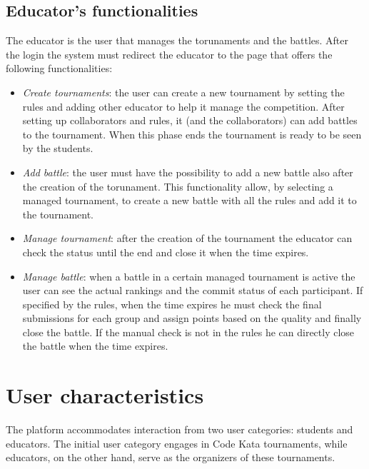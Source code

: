 \documentclass[12pt, a4paper]{report}
\begin{document}
    \subsection{Educator's functionalities}
    The educator is the user that manages the torunaments and the battles. 
    After the login the system must redirect the educator to the page that offers the following functionalities: 
    \begin{itemize}
        \item \textit{Create tournaments}: the user can create a new tournament by setting the rules and adding other educator to help it manage the competition. 
            After setting up collaborators and rules, it (and the collaborators) can add battles to the tournament. 
            When this phase ends the tournament is ready to be seen by the students. 
        \item \textit{Add battle}: the user must have the possibility to add a new battle also after the creation of the torunament. 
            This functionality allow, by selecting a managed tournament, to create a new battle with all the rules and add it to the tournament. 
        \item \textit{Manage tournament}: after the creation of the tournament the educator can check the status until the end and close it when the time expires. 
        \item \textit{Manage battle}: when a battle in a certain managed tournament is active the user can see the actual rankings and the commit status of each participant. 
            If specified by the rules, when the time expires he must check the final submissions for each group and assign points based on the quality and finally close the battle. 
            If the manual check is not in the rules he can directly close the battle when the time expires. 
    \end{itemize}

    \section{User characteristics}
    The platform accommodates interaction from two user categories: students and educators. The initial user category engages in Code Kata tournaments, while educators, 
    on the other hand, serve as the organizers of these tournaments.
    
\end{document}

